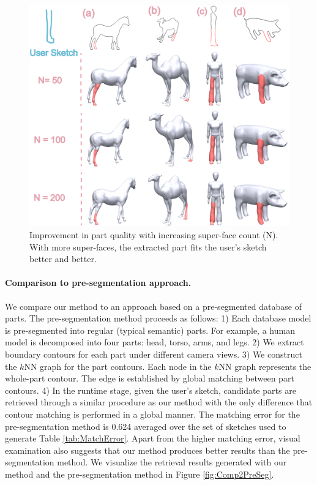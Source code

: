 \begin{figure}\centering
\includegraphics[width=0.9\linewidth]{./Material/SFGNVary.pdf}
\caption{Improvement in part quality with increasing super-face count (N). With more super-faces, the extracted part fits the user's sketch better and better.}
\label{fig:SFCountsPartQuality}
\end{figure}

\paragraph*{Comparison to pre-segmentation approach.} We compare our method to an approach based on a pre-segmented database of parts. The pre-segmentation method proceeds as follows: 1) Each database model is pre-segmented into regular (typical semantic) parts. For example, a human model is decomposed into four parts: head, torso, arms, and legs. 2) We extract boundary contours for each part under different camera views. 3) We construct the $k$NN graph for the part contours. Each node in the $k$NN graph represents the whole-part contour. The edge is established by global matching between part contours. 4) In the runtime stage, given the user's sketch, candidate parts are retrieved through a similar procedure as our method with the only difference that contour matching is performed in a global manner. The matching error for the pre-segmentation method is 0.624 averaged over the set of sketches used to generate Table \ref{tab:MatchError}. Apart from the higher matching error, visual examination also suggests that our method produces better results than the pre-segmentation method. We visualize the retrieval results generated with our method and the pre-segmentation method in Figure \ref{fig:Comp2PreSeg}.

